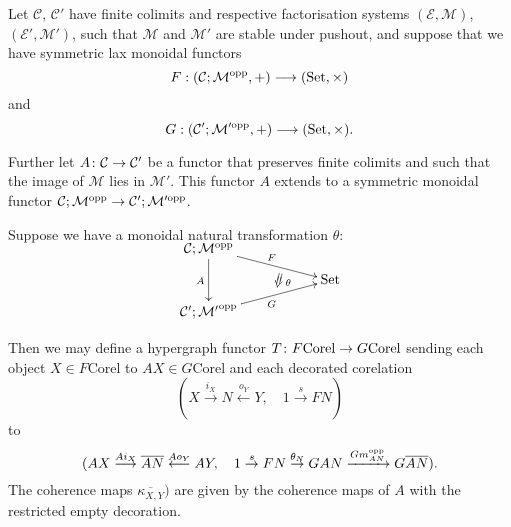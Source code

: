 \begin{proposition}\label{prop.deccorelfunctors}
  Let $\mathcal C$, $\mathcal C'$ have finite colimits and respective
factorisation systems $(\mathcal E, \mathcal M)$, $(\mathcal E', \mathcal M')$,
such that $\mathcal M$ and $\mathcal M'$ are stable under pushout, and suppose
that we have symmetric lax monoidal functors
\[
  F: (\mathcal C;\mathcal M^{\mathrm{opp}},+) \longrightarrow (\mathrm{Set}, \times)
\]
and
\[
  G: (\mathcal C';\mathcal M'^{\mathrm{opp}},+) \longrightarrow (\mathrm{Set}, \times).
\]

Further let $A{\colon} \mathcal C \to \mathcal C'$ be a functor that preserves
finite colimits and such that the image of $\mathcal M$ lies in $\mathcal M'$.
This functor $A$ extends to a symmetric monoidal functor $\mathcal C;\mathcal M^{\mathrm{opp}} \to
\mathcal C';\mathcal M'^{\mathrm{opp}}$.

Suppose we have a monoidal natural transformation $\theta$:
\[
  \xymatrixrowsep{2ex}
  \xymatrix{
    \mc C; \mc M^\opp \ar[dd]_{A} \ar[drr]^F  \\
    &\twocell \omit{_\:\theta}& \Set \\
    \mc C'; \mc {M'}^\opp \ar[urr]_{G} 
  }
\]

Then we may define a hypergraph functor $T{\colon} F\mathrm{Corel} \to
G\mathrm{Corel}$ sending each object $X \in F\mathrm{Corel}$ to $AX \in
G\mathrm{Corel}$ and each decorated corelation 
\[
  (X \stackrel{i_X}{\longrightarrow} N \stackrel{o_Y}{\longleftarrow} Y, \quad
  1 \stackrel{s}{\to} FN)
\]
to
\[
  (AX \stackrel{Ai_X}{\longrightarrow} \overline{AN} \stackrel{Ao_Y}{\longleftarrow} AY,
  \quad 1 \stackrel{s}{\to} FN \stackrel{\theta_N}{\to} GAN
  \xrightarrow{Gm_{AN}^{\mathrm{opp}}} G\overline{AN}).
\]
The coherence maps $\overline{\kappa_{X,Y}})$ are given by the coherence maps of $A$ with the restricted empty decoration.
\end{proposition}
